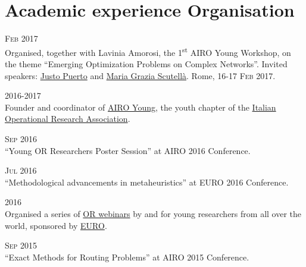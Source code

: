 \section*{Academic experience {\small Organisation}}

\begin{paracol}{2}
    \textsc{Feb 2017}
\switchcolumn
    \\
    Organised, together with Lavinia Amorosi, the 1\textsuperscript{st} AIRO Young Workshop, on the theme ``Emerging Optimization Problems on Complex Networks''. Invited speakers: \href{http://scholar.google.com/citations?user=koF66usAAAAJ}{Justo Puerto} and \href{http://scholar.google.com/citations?user=PcGjfV8AAAAJ}{Maria Grazia Scutellà}. Rome, \textsc{16-17 Feb 2017}.
\end{paracol}

\begin{paracol}{2}
  \textsc{2016-2017}
\switchcolumn
  \\
  Founder and coordinator of \href{http://airoyoung.org}{AIRO Young}, the youth chapter of the \href{http://www.airo.org}{Italian Operational Research Association}.
\end{paracol}

\begin{paracol}{2}
  \textsc{Sep 2016}
\switchcolumn
  \\
  ``Young OR Researchers Poster Session'' at AIRO 2016 Conference.
\end{paracol}

\begin{paracol}{2}
  \textsc{Jul 2016}
\switchcolumn
  \\
  ``Methodological advancements in metaheuristics'' at EURO 2016 Conference.
\end{paracol}

\begin{paracol}{2}
    \textsc{2016}
\switchcolumn
  \\
  Organised a series of \href{http://santini.in/seminars}{OR webinars} by and for young researchers from all over the world, sponsored by \href{http://euro-online.org}{EURO}.
\end{paracol}

\begin{paracol}{2}
  \textsc{Sep 2015}
\switchcolumn
  \\
  ``Exact Methods for Routing Problems'' at AIRO 2015 Conference.
\end{paracol}

